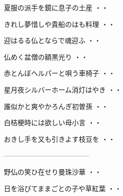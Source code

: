 \vspace{0.6cm}
\begin{shiika}夏服の派手を鏡に息子の土産
\hfill{・・}\end{shiika}
\vspace{0.6cm}
\begin{shiika}きれし夢惜しや貴船のはも料理
\hfill{・・}\end{shiika}
\vspace{0.6cm}
\begin{shiika}迎はるる仏とならで魂迎ふ
\hfill{・・}\end{shiika}
\vspace{0.6cm}
\begin{shiika}仏めく盆僧の額黒光り
\hfill{・・}\end{shiika}
\vspace{0.6cm}
\begin{shiika}赤とんぼヘルパーと唄う車椅子
\hfill{・・}\end{shiika}
\vspace{0.6cm}
\begin{shiika}星月夜シルバーホーム消灯はやき
\hfill{・・}\end{shiika}
\vspace{0.6cm}
\begin{shiika}誰似かと爽やかろんぎ初曽孫
\hfill{・・}\end{shiika}
\vspace{0.6cm}
\begin{shiika}白桔梗時には欲しい母小言
\hfill{・・}\end{shiika}
\vspace{0.6cm}
\begin{shiika}おきし手を又も引きよす枝豆を
\hfill{・・}\end{shiika}
--------------------------------------
\vspace{0.6cm}
\begin{shiika}野仏の笑ひ在せり曼珠沙華
\hfill{・・}\end{shiika}
\vspace{0.6cm}
\begin{shiika}日を浴びてままごとの子や草紅葉
\hfill{・・}\end{shiika}
